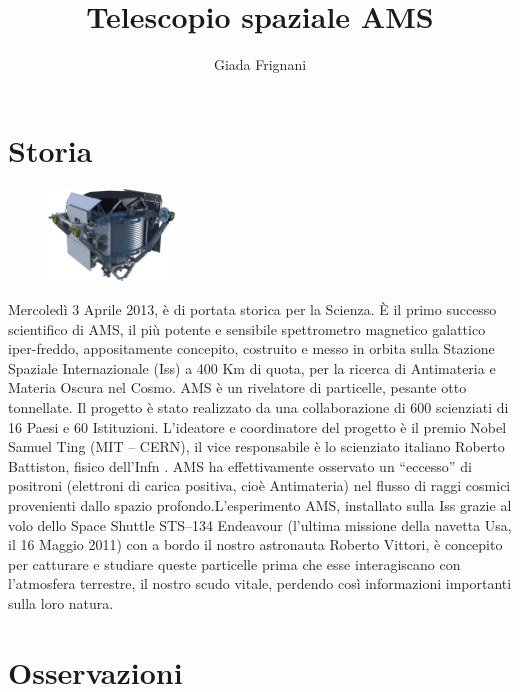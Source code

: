 \documentclass[12pt,a4paper]{article}
\begin{document}
\title{\vspace{-70pt}Telescopio spaziale AMS}
\author{Giada Frignani}
\date{}
\maketitle
\pagestyle{empty}
\thispagestyle{empty}

\section*{Storia}
\label{storia}
\begin{figure}
  \vspace{-10pt}
  \begin{center}
    \includegraphics[width=0.30\textwidth]{satellite}
  \end{center}
  \vspace{-20pt}
\end{figure}
Mercoledì 3 Aprile 2013, è di portata storica per la Scienza. È il primo successo scientifico di AMS, il più potente e sensibile spettrometro magnetico galattico iper-freddo, appositamente concepito, costruito e messo in orbita sulla Stazione Spaziale Internazionale (Iss) a 400 Km di quota, per la ricerca di Antimateria e Materia Oscura nel Cosmo. AMS è un rivelatore di particelle, pesante otto tonnellate. Il progetto è stato realizzato da una collaborazione di 600 scienziati di 16 Paesi e 60 Istituzioni. L’ideatore e coordinatore del progetto è il premio Nobel Samuel Ting (MIT – CERN), il vice responsabile è lo scienziato italiano Roberto Battiston, fisico dell’Infn . AMS ha effettivamente osservato un “eccesso” di positroni (elettroni di carica positiva, cioè Antimateria) nel flusso di raggi cosmici provenienti dallo spazio profondo.L’esperimento AMS, installato sulla Iss grazie al volo dello Space Shuttle STS--134 Endeavour (l’ultima missione della navetta Usa, il 16 Maggio 2011) con a bordo il nostro astronauta Roberto Vittori, è concepito per catturare e studiare queste particelle prima che esse interagiscano con l’atmosfera terrestre, il nostro scudo vitale, perdendo così informazioni importanti sulla loro natura.

\section*{Osservazioni}
\label{osservazioni}
\end{document}
